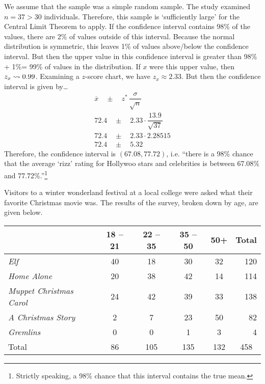 \documentclass[12pt,letterpaper]{exam}
\begin{document}
\begin{questions}
\sol We assume that the sample was a simple random sample. The study examined $n= 37 > 30$ individuals. Therefore, this sample is `sufficiently large' for the Central Limit Theorem to apply. If the confidence interval contains 98\% of the values, there are 2\% of values outside of this interval. Because the normal distribution is symmetric, this leaves 1\% of values above/below the confidence interval.  But then the upper value in this confidence interval is greater than 98\% + 1\%= 99\% of values in the distribution. If $x$ were this upper value, then $z_x \rightsquigarrow 0.99$. Examining a $z$-score chart, we have $z_x \approx 2.33$. But then the confidence interval is given by\dots
	\[
	\begin{gathered}
	\overline{x} \quad \pm \quad z^* \, \dfrac{\sigma}{\sqrt{n}} \\[0.3cm]
	72.4 \quad \pm \quad 2.33 \cdot \dfrac{13.9}{\sqrt{37}} \\[0.3cm]
	72.4 \quad \pm \quad 2.33 \cdot 2.28515 \\[0.3cm]
	72.4 \quad \pm \quad 5.32
	\end{gathered}
	\]
Therefore, the confidence interval is $(67.08, 77.72)$, i.e. ``there is a 98\% chance that the average `rizz' rating for Hollywoo stars and celebrities is between 67.08\% and 77.72\%.''\footnote{Strictly speaking, a 98\% chance that this interval contains the true mean.} 



\newpage
\question[10] Visitors to a winter wonderland festival at a local college were asked what their favorite Christmas movie was. The results of the survey, broken down by age, are given below. \par
	\begin{table}[H]
	\centering
	\begin{tabular}{|l|cccc|r|} \hline
	 & 18 -- 21 & 22 -- 35 & 35 -- 50 & 50+ & \multicolumn{1}{c|}{Total} \\ \hline
	\textit{Elf} & 40 & 18 & 30 & 32 & 120 \\
	\textit{Home Alone} & 20 & 38 & 42 & 14 & 114 \\
	\textit{Muppet Christmas Carol} & 24 & 42 & 39 & 33 & 138 \\
	\textit{A Christmas Story} & 2 & 7 & 23 & 50 & 82 \\
	\textit{Gremlins} & 0 & 0 & 1 & 3 & 4 \\ \hline
	Total & 86 & 105 & 135 & 132 & \multicolumn{1}{c|}{458} \\ \hline
	\end{tabular}
	\end{table} \par


\end{questions}
\end{document}
